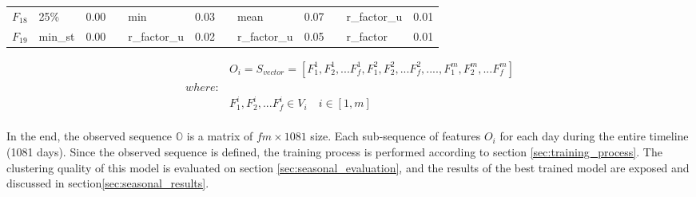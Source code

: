 \begin{table}[]
\begin{tabular}{|l|l|l|l|l|l|l|l|l|lll}
$F_{18}$                                       & 25\%                                                             & 0.00                                                                &                                         & min                                                              & 0.03                                                                &                                         & mean                                                             & 0.07                                                                & \multicolumn{1}{l|}{}                   & \multicolumn{1}{l|}{r\_factor\_u}                                & \multicolumn{1}{l|}{0.01}                                           \\ \cline{1-3} \cline{5-6} \cline{8-9} \cline{11-12} 
$F_{19}$                                       & min\_st                                                          & 0.00                                                                &                                         & r\_factor\_u                                                     & 0.02                                                                &                                         & r\_factor\_u                                                     & 0.05                                                                &                                         & r\_factor                                                        & 0.01                                                                \\ \cline{1-3} \cline{5-6} \cline{8-9} \cline{11-12}
\end{tabular}
\end{table}




\begin{equation}
\begin{array}{lc}
 & O_i = S_{vector}= [F_1^1, F_2^1,... F_f^1, F_1^2, F_2^2,...F_f^2, ...., F_1^m,F_2^m, ...F_f^m] \\
where: &  \\ 
& F_1^i, F_2^i,... F_f^i \in V_i \quad i \in [1,m] \\

\end{array}
\end{equation}

In the end, the observed sequence $\mathbb{O}$ is a matrix of $fm \times 1081$ size. Each sub-sequence of features $O_i$ for each day during the entire timeline (1081 days). Since the observed sequence is defined, the training process is performed according to section \ref{sec:training_process}. The clustering quality of this model is evaluated on section \ref{sec:seasonal_evaluation}, and the results of the best trained model are exposed and discussed in section\ref{sec:seasonal_results}. 

